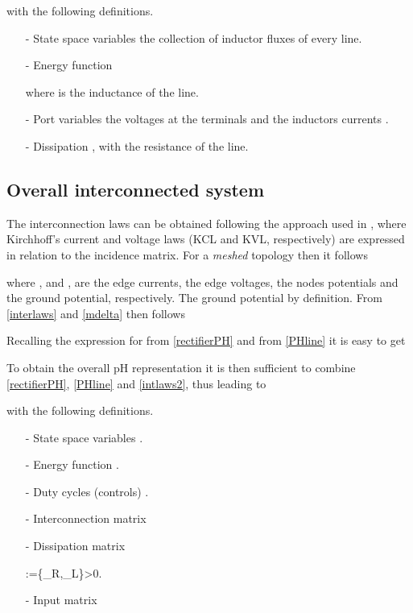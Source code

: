 \documentclass[5p,twocolumn]{elsarticle}
\def\begequ{}
\def\lab{\label}
\numberwithin{equation}{section}
\begin{document}
with  the following definitions.
\begin{itemize}
\item[-] State space variables the collection of inductor fluxes  of every line.
\item[-] Energy function

where  is the inductance of the line.

\item[-] Port variables the voltages at the terminals  and the inductors currents .

\item[-] Dissipation , with  the resistance of the line.
\end{itemize}
\subsection{Overall interconnected system}
\lab{subsec2.4}
The interconnection laws can be obtained following the approach used in \cite{avdspartial}, where Kirchhoff's current and voltage laws (KCL and KVL, respectively) are expressed in relation to the incidence matrix. For a \textit{meshed} topology then it follows

where ,  and ,  are the edge currents, the edge voltages, the nodes potentials and
the {ground} potential, respectively. The {ground} potential  by definition. From \eqref{interlaws} and \eqref{mdelta} then follows

Recalling the expression for  from \eqref{rectifierPH} and  from \eqref{PHline} it is easy to get

To obtain the overall pH representation it is then sufficient to combine \eqref{rectifierPH}, \eqref{PHline} and \eqref{intlaws2}, thus leading to

with  the following definitions.
\begin{itemize}
\item[-] State space variables .

\item[-] Energy function .

\item[-] Duty cycles (controls) .

\item[-] Interconnection matrix


\item[-] Dissipation matrix
\begequ
\lab{dismat}
:=\{_{R},_{L}\}>0.
\endequ
\item[-] Input matrix 
\end{itemize}
\end{document}
